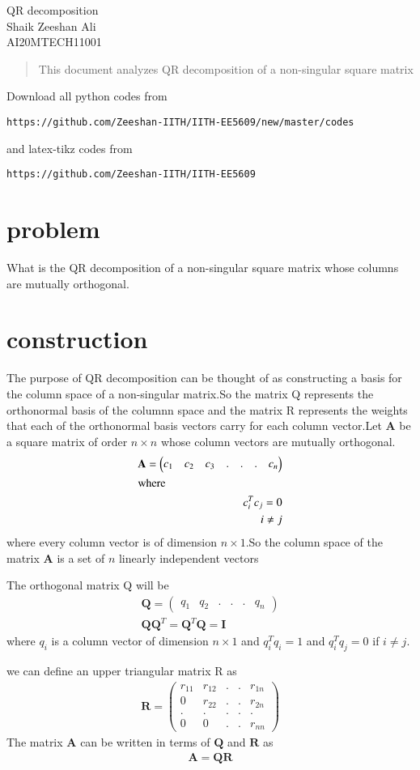 \documentclass[journal,12pt,twocolumn]{IEEEtran}
\newcommand{\myvec}[1]{\ensuremath{\begin{pmatrix}#1\end{pmatrix}}}
\numberwithin{equation}{subsection}
\let\vec\mathbf
\begin{document}
\begin{center}
\huge QR decomposition\\

\large Shaik Zeeshan Ali\\
\large AI20MTECH11001\\
\end{center}
\begin{abstract}
This document analyzes QR decomposition of a non-singular square matrix
\end{abstract}
Download all python codes from 
\begin{lstlisting}
https://github.com/Zeeshan-IITH/IITH-EE5609/new/master/codes
\end{lstlisting}

and latex-tikz codes from 
\begin{lstlisting}
https://github.com/Zeeshan-IITH/IITH-EE5609
\end{lstlisting}
\section{problem}
What is the QR decomposition of a non-singular square matrix whose columns are mutually orthogonal.
\section{construction}
The purpose of QR decomposition can be thought of as constructing a basis for the column space of a non-singular matrix.So the matrix Q represents the orthonormal basis of the columnn space and the matrix R represents the weights that each of the orthonormal basis vectors carry for each column vector.Let $\vec{A}$ be a square matrix of order $n\times n$ whose column vectors are mutually orthogonal.
\begin{align}
    \vec{A}=\myvec{c_1& c_2 & c_3 & .& .&.&c_n}\\
    \intertext{where}
    c_i^Tc_j=0\notag\\
    i\neq j\label{eq:1}
\end{align}
where every column vector is of dimension $n\times 1$.So the column space of the matrix $\vec{A}$ is a set of $n$ linearly independent vectors\par
The orthogonal matrix Q will be 
\begin{align}
    \vec{Q}=\myvec{q_1&q_2&.&.&.&q_n}\\
    \vec{Q}\vec{Q}^T=\vec{Q}^T\vec{Q}=\vec{I}
\end{align}
where $q_i$ is a column vector of dimension $n\times1$ and $q_i^Tq_i=1$ and $q_i^Tq_j=0$ if $i\neq j$.\par
we can define an upper triangular matrix R as
\begin{align}
    \vec{R}=\myvec{r_{11}&r_{12}&.&.&r_{1n}\\0&r_{22}&.&.&r_{2n}\\.&.&.&.&.\\0&0&.&.&r_{nn}}
\end{align}
The matrix $\vec{A}$ can be written in terms of $\vec{Q}$ and $\vec{R}$ as
\begin{align}
    \vec{A}=\vec{Q}\vec{R}
\end{align}
\end{document}
